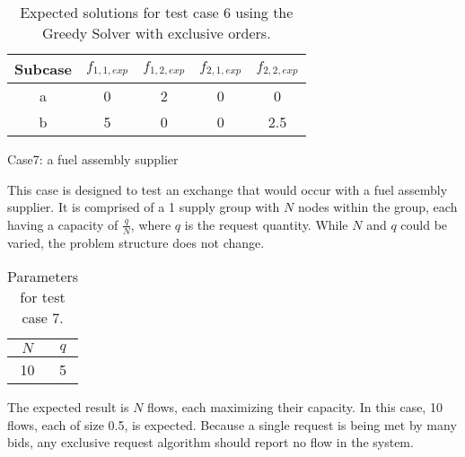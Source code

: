 \begin{table}[ht]
  \begin{center}
    \caption{Expected solutions for test case 6 using the Greedy Solver with 
      exclusive orders.}
    \begin{tabular}{ccccc}
    \toprule
    Subcase & $f_{1, 1, exp}$ & $f_{1, 2, exp}$ 
    & $f_{2, 1, exp}$ & $f_{2, 2, exp}$ \\
    \midrule
    a & 0  & 2  & 0  & 0   \\
    b & 5  & 0  & 0  & 2.5 \\
    \bottomrule
    \end{tabular}
  \end{center}
\end{table}

Case7: a fuel assembly supplier

This case is designed to test an exchange that would occur with a fuel assembly
supplier. It is comprised of a 1 supply group with $N$ nodes within the group,
each having a capacity of $\frac{q}{N}$, where $q$ is the request
quantity. While $N$ and $q$ could be varied, the problem structure does not
change.

\begin{table}[ht]
  \begin{center}
    \caption{Parameters for test case 7.}
    \begin{tabular}{cc}
    \toprule
    $N$ & $q$ \\
    \midrule
    10 & 5 \\
    \bottomrule
    \end{tabular}
  \end{center}
\end{table}

The expected result is $N$ flows, each maximizing their capacity. In this case,
10 flows, each of size 0.5, is expected. Because a single request is being met
by many bids, any exclusive request algorithm should report no flow in the
system.
